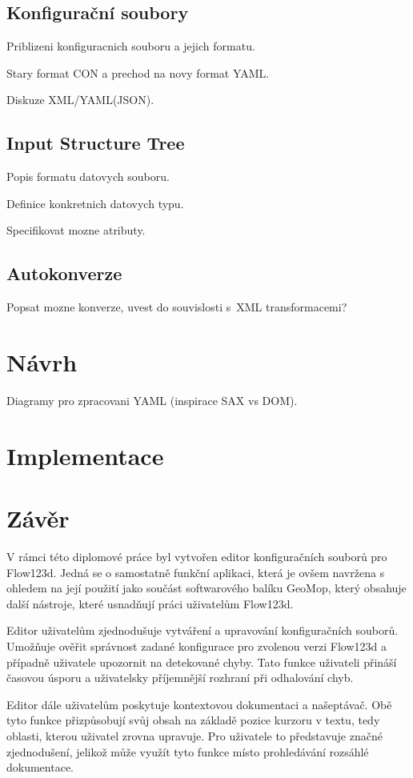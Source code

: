 \documentclass[FM,DP]{tulthesis}
\begin{document}
\section{Konfigurační soubory}
Priblizeni konfiguracnich souboru a jejich formatu.

Stary format CON a prechod na novy format YAML.

Diskuze XML/YAML(JSON). 

\section{Input Structure Tree}
Popis formatu datovych souboru.

Definice konkretnich datovych typu.

Specifikovat mozne atributy.

\section{Autokonverze}
Popsat mozne konverze, uvest do souvislosti s~XML transformacemi?


\chapter{Návrh}
Diagramy pro zpracovani YAML (inspirace SAX vs DOM).




\chapter{Implementace}


\chapter*{Závěr}
V rámci této diplomové práce byl vytvořen editor konfiguračních souborů pro Flow123d. Jedná se o samostatně funkční aplikaci, která je ovšem navržena s ohledem na její použití jako součást softwarového balíku GeoMop, který obsahuje další nástroje, které usnadňují práci uživatelům Flow123d.

Editor uživatelům zjednodušuje vytváření a upravování konfiguračních souborů. Umožňuje ověřit správnost zadané konfigurace pro zvolenou verzi Flow123d a případně uživatele upozornit na detekované chyby. Tato funkce uživateli přináší časovou úsporu a uživatelsky příjemnější rozhraní při odhalování chyb.

Editor dále uživatelům poskytuje kontextovou dokumentaci a našeptávač. Obě tyto funkce přizpůsobují svůj obsah na základě pozice kurzoru v textu, tedy oblasti, kterou uživatel zrovna upravuje. Pro uživatele to představuje značné zjednodušení, jelikož může využít tyto funkce místo prohledávání rozsáhlé dokumentace.
\end{document}

